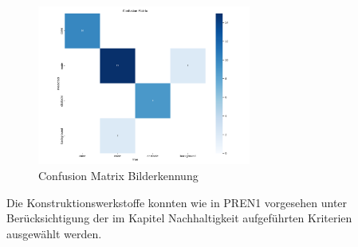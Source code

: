 \begin{figure}[H]
\centering
\includegraphics[width=7cm]{assets/IT/yolo/confusion_matrix.png}
\caption{Confusion Matrix Bilderkennung}
\label{fig:conf-matrix-model}
\end{figure}


Die Konstruktionswerkstoffe konnten wie in PREN1 vorgesehen unter Berücksichtigung der im Kapitel Nachhaltigkeit aufgeführten Kriterien ausgewählt werden.